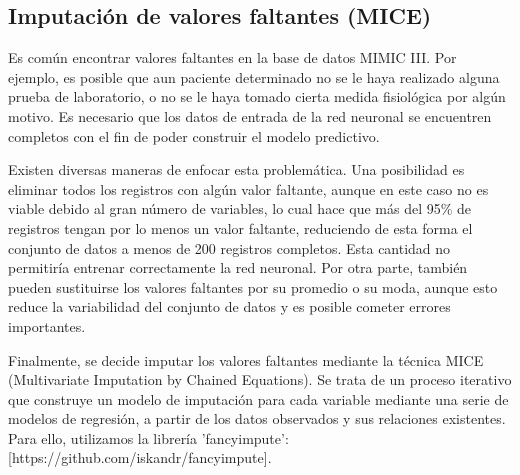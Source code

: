 \documentclass{report}
\begin{document}
\subsection{Imputación de valores faltantes (MICE)}
Es común encontrar valores faltantes en la base de datos MIMIC III. Por ejemplo, es posible que aun paciente determinado no se le haya realizado alguna prueba de laboratorio, o no se le haya tomado cierta medida fisiológica por algún motivo. Es necesario que los datos de entrada de la red neuronal se encuentren completos con el fin de poder construir el modelo predictivo. 

Existen diversas maneras de enfocar esta problemática. Una posibilidad es eliminar todos los registros con algún valor faltante, aunque en este caso no es viable debido al gran número de variables, lo cual hace que más del 95\% de registros tengan por lo menos un valor faltante, reduciendo de esta forma el conjunto de datos a menos de 200 registros completos. Esta cantidad no permitiría entrenar correctamente la red neuronal. Por otra parte, también pueden sustituirse los valores faltantes por su promedio o su moda, aunque esto reduce la variabilidad del conjunto de datos y es posible cometer errores importantes. 

Finalmente, se decide imputar los valores faltantes mediante la técnica MICE (Multivariate Imputation by Chained Equations). Se trata de un proceso iterativo que construye un modelo de imputación para cada variable mediante una serie de modelos de regresión, a partir de los datos observados y sus relaciones existentes. Para ello, utilizamos la librería 'fancyimpute': [https://github.com/iskandr/fancyimpute].
\end{document}
